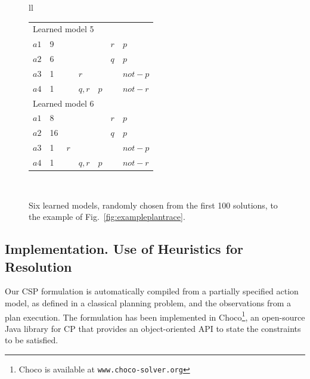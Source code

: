 \documentclass[10pt,journal,compsoc]{IEEEtran}
\begin{document}
\begin{figure}
{\begin{tabular}{ll}
\begin{tabular}{lllllll}
			\hline
			
			\multicolumn{7}{l}{Learned model 5} \\
			$a1$ & 9 & & & & $r$ & $p$ \\
			$a2$ & 6 & & & & $q$ & $p$ \\
			$a3$ & 1 & & $r$ & & & $not-p$ \\
			$a4$ & 1 & & $q,r$ & $p$ & & $not-r$ \\
			
			\hline
			
			\multicolumn{7}{l}{Learned model 6} \\
			$a1$ & 8 & & & & $r$ & $p$ \\
			$a2$ & 16 & & & & $q$ & $p$ \\
			$a3$ & 1 & $r$ & & & & $not-p$ \\
			$a4$ & 1 & & $q,r$ & $p$ & & $not-r$ \\
			
		\end{tabular} \\
		
	\end{tabular}
	}
	
	\caption{Six learned models, randomly chosen from the first 100 solutions, to the example of Fig.~\ref{fig:exampleplantrace}.}
	\label{figure:solutionsExample}
\end{figure}






\subsection{Implementation. Use of Heuristics for Resolution}
\label{sec:implementation}

Our CSP formulation is automatically compiled from a partially specified action model, as defined in a classical planning problem, and the observations from a plan execution.
The formulation has been implemented in \textsf{Choco}\footnote{\textsf{Choco} is available at \texttt{www.choco-solver.org}}, an open-source Java library for CP that provides an object-oriented API to state the constraints to be satisfied.
\end{document}
